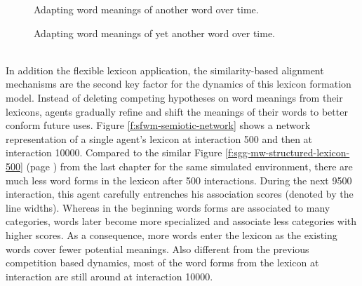 \begin{figure}[t]
  \caption{Adapting word meanings of another word over time.}
  \label{f:sfwm-attribute-scores-2}
\end{figure}

\begin{figure}[t]
  \caption{Adapting word meanings of yet another word over time.}
  \label{f:sfwm-attribute-scores-3}
\end{figure}

\stopfiguregroup


~\\

\noindent In addition the flexible lexicon application, the
similarity-based alignment mechanisms are the second key factor for
the dynamics of this lexicon formation model. Instead of deleting
competing hypotheses on word meanings from their lexicons, agents
gradually refine and shift the meanings of their words to better
conform future uses.  Figure \ref{f:sfwm-semiotic-network} shows a
network representation of a single agent's lexicon at interaction 500
and then at interaction 10000. Compared to the similar Figure
\ref{f:sgg-mw-structured-lexicon-500} (page
\pageref{f:sgg-mw-structured-lexicon-500}) from the last chapter for
the same simulated environment, there are much less word forms in the
lexicon after 500 interactions. During the next 9500 interaction, this
agent carefully entrenches his association scores (denoted by the line
widths). Whereas in the beginning words forms are associated to many
categories, words later become more specialized and associate less
categories with higher scores. As a consequence, more words enter the
lexicon as the existing words cover fewer potential meanings. Also
different from the previous competition based dynamics, most of the
word forms from the lexicon at interaction are still around at
interaction 10000.

